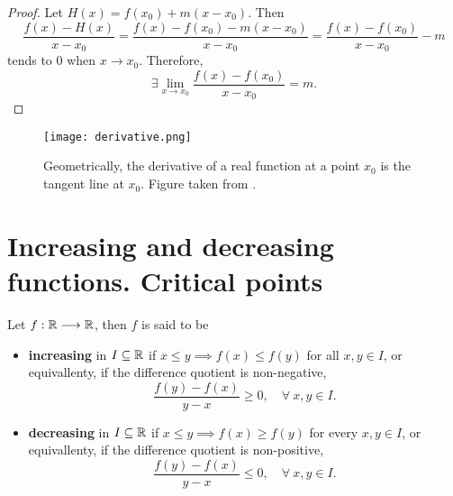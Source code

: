 \begin{proof}
    Let $H\left( x \right) = f\left( x_0 \right) + m\left( x - x_0 \right)$. Then
    \begin{equation}
        \frac{f\left( x \right) - H\left( x \right) }{x - x_0} = \frac{f\left( x \right) - f\left( x_0 \right) - m\left( x - x_0 \right) }{x - x_0} = \frac{f\left( x \right) - f\left( x_0 \right)}{x - x_0} - m
    \end{equation}
    tends to 0 when $x\to x_0$. Therefore,
    \begin{equation}
        \exists \lim_{x\to x_0}\frac{f\left( x \right) - f\left( x_0 \right) }{x - x_0} = m.
    \end{equation}
\end{proof}

\begin{figure}[h]
    \centering
    \texttt{[image: derivative.png]}
    \caption{Geometrically, the derivative of a real function at a point $x_0$ is the tangent line at $x_0$.
    Figure taken from \cite{spivak}.}
\end{figure}

\section{Increasing and decreasing functions. Critical points}

\begin{defi}
    Let $f : \mathbb{R}\longrightarrow \mathbb{R}$, then $f$ is said to be
    \begin{itemize}[itemsep = -2pt]
        \item \textbf{increasing} in $I\subseteq\mathbb{R}$ if $x\leq y\implies f\left( x \right) \leq f\left( y \right) $ for all $x, y\in I$, or equivallenty, if the difference quotient is non-negative,
            \begin{equation}
                \frac{f\left( y \right) - f\left( x \right) }{y - x} \geq 0,\quad\forall\ x, y\in I.
            \end{equation}
        \item \textbf{decreasing} in $I\subseteq\mathbb{R}$ if $x\leq y\implies f\left( x \right) \geq f\left( y \right) $ for every $x, y\in I$, or equivallenty, if the difference quotient is non-positive,
            \begin{equation}
                \frac{f\left( y \right) - f\left( x \right) }{y - x} \leq 0,\quad\forall\ x, y\in I.
            \end{equation}
    \end{itemize}
\end{defi}

